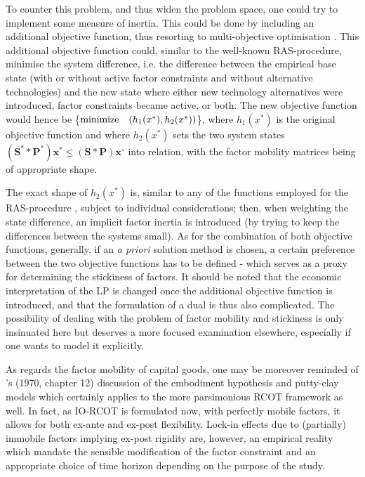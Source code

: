 To counter this problem, and thus widen the problem space, one could try to implement some measure of inertia. This could be done by including an additional objective function, thus resorting to multi-objective optimisation \parencite[for a review of multi-objective LP in IO, see ][]{oliveira_2014}. This additional objective function could, similar to the well-known RAS-procedure, minimise the system difference, i.e. the difference between the empirical base state (with or without active factor constraints and without alternative technologies) and the new state where either new technology alternatives were introduced, factor constraints became active, or both. The new objective function would hence be \{$ {\rm minimize} \quad (h_{1}(x^{*}), h_{2}(x^{*}))$\}, where $h_{1}(x^{*})$ is the original objective function and where $h_{2}(x^{*})$ sets the two system states $(\bm{S}^{*} \ast \bm{P}^{*}) \bm{x}^{*} \le (\bm{S} \ast \bm{P}) \bm{x}^{\circ}$ into relation, with the factor mobility matrices being of appropriate shape.

The exact shape of $h_{2}(x^{*})$ is, similar to any of the functions employed for the RAS-procedure \parencite{jackson_2004}, subject to individual considerations; then, when weighting the state difference, an implicit factor inertia is introduced (by trying to keep the differences between the systems small). As for the combination of both objective functions, generally, if an \textit{a priori} solution method is chosen, a certain preference between the two objective functions has to be defined - which serves as a proxy for determining the stickiness of factors. It should be noted that the economic interpretation of the LP is changed once the additional objective function is introduced, and that the formulation of a dual is thus also complicated. The possibility of dealing with the problem of factor mobility and stickiness is only insinuated here but deserves a more focused examination elsewhere, especially if one wants to model it explicitly.

As regards the factor mobility of capital goods, one may be moreover reminded of \citeauthor{carter1970}'s (1970, chapter 12) discussion of the embodiment hypothesis and putty-clay models which certainly applies to the more parsimonious RCOT framework as well. In fact, as IO-RCOT is formulated now, with perfectly mobile factors, it allows for both ex-ante and ex-post flexibility. Lock-in effects due to (partially) immobile factors implying ex-post rigidity are, however, an empirical reality which mandate the sensible modification of the factor constraint and an appropriate choice of time horizon depending on the purpose of the study.

